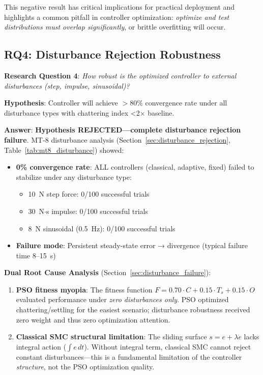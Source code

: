This negative result has critical implications for practical deployment and highlights a common pitfall in controller optimization: \textit{optimize and test distributions must overlap significantly}, or brittle overfitting will occur.

\subsection{RQ4: Disturbance Rejection Robustness}
\label{subsec:answer_rq4}

\textbf{Research Question 4}: \textit{How robust is the optimized controller to external disturbances (step, impulse, sinusoidal)?}

\textbf{Hypothesis}: Controller will achieve $>80$\% convergence rate under all disturbance types with chattering index <2$\times$ baseline.

\textbf{Answer}: \textbf{Hypothesis REJECTED—complete disturbance rejection failure}. MT-8 disturbance analysis (Section~\ref{sec:disturbance_rejection}, Table~\ref{tab:mt8_disturbance}) showed:
\begin{itemize}
    \item \textbf{0\% convergence rate}: ALL controllers (classical, adaptive, fixed) failed to stabilize under any disturbance type:
    \begin{itemize}
        \item 10~N step force: 0/100 successful trials
        \item 30~N$\cdot$s impulse: 0/100 successful trials
        \item 8~N sinusoidal (0.5~Hz): 0/100 successful trials
    \end{itemize}
    \item \textbf{Failure mode}: Persistent steady-state error → divergence (typical failure time 8--15~s)
\end{itemize}

\textbf{Dual Root Cause Analysis} (Section~\ref{sec:disturbance_failure}):
\begin{enumerate}
    \item \textbf{PSO fitness myopia}: The fitness function $F = 0.70 \cdot C + 0.15 \cdot T_s + 0.15 \cdot O$ evaluated performance under \textit{zero disturbances only}. PSO optimized chattering/settling for the easiest scenario; disturbance robustness received zero weight and thus zero optimization attention.

    \item \textbf{Classical SMC structural limitation}: The sliding surface $s = e + \lambda \dot{e}$ lacks integral action ($\int e \, dt$). Without integral term, classical SMC cannot reject constant disturbances—this is a fundamental limitation of the controller \textit{structure}, not the PSO optimization quality.
\end{enumerate}

